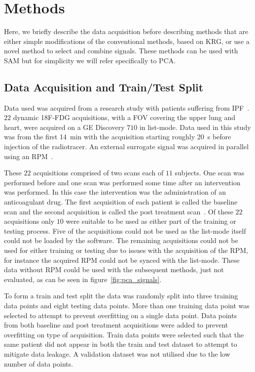 \section{Methods} \label{sec:methods}
    Here, we briefly describe the data acquisition before describing methods that are either simple modifications of the conventional methods, based on \gls{KRG}, or use a novel method to select and combine signals. These methods can be used with \gls{SAM} but for simplicity we will refer specifically to \gls{PCA}.

    \subsection{Data Acquisition and Train/Test Split} \label{sec:data_acquisition_and_train_test_split}
        Data used was acquired from a research study with patients suffering from \gls{IPF}~\parencite{Emond2020EffectReconstruction}. $22$ dynamic \gls{18F-FDG} acquisitions, with a \gls{FOV} covering the upper lung and heart, were acquired on a \gls{GE} Discovery $710$ in list-mode. Data used in this study was from the first \SI{14}{\minute} with the acquisition starting roughly \SI{20}{\second} before injection of the radiotracer. An external surrogate signal was acquired in parallel using an \gls{RPM}~\parencite{Oh2019OptimalTreatment}.

        These $22$ acquisitions comprised of two scans each of $11$ subjects. One scan was performed before and one scan was performed some time after an intervention was performed. In this case the intervention was the administration of an anticoagulant drug. The first acquisition of each patient is called the baseline scan and the second acquisition is called the post treatment scan~\parencite{Emond2020EffectReconstruction}. Of these $22$ acquisitions only $10$ were suitable to be used as either part of the training or testing process. Five of the acquisitions could not be used as the list-mode itself could not be loaded by the software. The remaining acquisitions could not be used for either training or testing due to issues with the acquisition of the \gls{RPM}, for instance the acquired \gls{RPM} could not be synced with the list-mode. These data without \gls{RPM} could be used with the subsequent methods, just not evaluated, as can be seen in figure~\ref{fig:pca_signals}.

        To form a train and test split the data was randomly split into three training data points and eight testing data points. More than one training data point was selected to attempt to prevent overfitting on a single data point. Data points from both baseline and post treatment acquisitions were added to prevent overfitting on type of acquisition. Train data points were selected such that the same patient did not appear in both the train and test dataset to attempt to mitigate data leakage. A validation dataset was not utilised due to the low number of data points.

